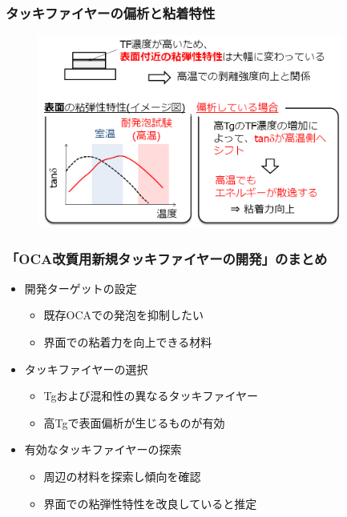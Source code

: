 \documentclass[unicode,12pt]{beamer}%
\begin{document}
\begin{frame}\frametitle{タッキファイヤーの偏析と粘着特性}
	\begin{figure}
		\begin{center}
			\includegraphics[width=100mm]{PSA2.png}
		\end{center}
	\end{figure}
\end{frame}


\begin{frame}
	\frametitle{「OCA改質用新規タッキファイヤーの開発」のまとめ}
        \begin{boxnote}
            \vspace{-3mm}
            \begin{itemize}
                \item 開発ターゲットの設定
                    \begin{itemize}
                        \item 既存OCAでの発泡を抑制したい
                        \item 界面での粘着力を向上できる材料
                    \end{itemize} 
                \item タッキファイヤーの選択
                    \begin{itemize}
                        \item Tgおよび混和性の異なるタッキファイヤー
                        \item 高Tgで表面偏析が生じるものが有効
                    \end{itemize} 
                \item 有効なタッキファイヤーの探索
                    \begin{itemize}
                        \item 周辺の材料を探索し傾向を確認
                        \item 界面での粘弾性特性を改良していると推定
                    \end{itemize}
            \end{itemize}
        \end{boxnote}
\end{frame}
\end{document}
